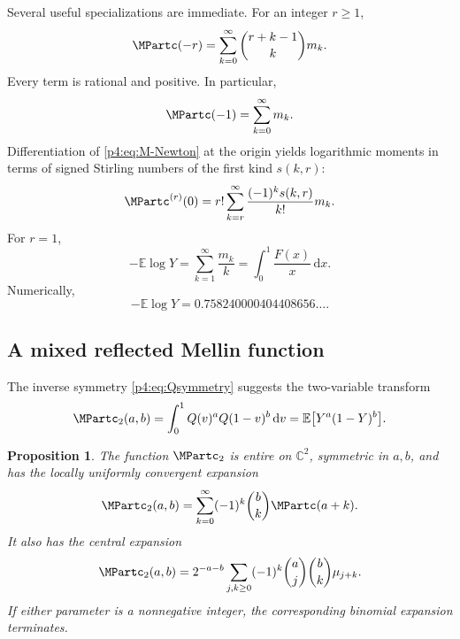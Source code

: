 \documentclass[11pt,oneside]{article}
\newtheorem{proposition}[theorem]{Proposition}
\theoremstyle{definition}
\theoremstyle{remark}
\newcommand{\F}{F}
\newcommand{\Q}{Q}
\newcommand{\E}{\mathbb E}
\newcommand{\C}{\mathbb C}
\newcommand{\dd}{\,\mathrm d}
\newcommand{\1}{\mathbf 1}
\begin{document}
Several useful specializations are immediate.  For an integer \(r\ge1\),
\begin{equation}\label{p4:eq:negative-moment-rational-series}
 \MPartc(-r)=\sum_{k=0}^{\infty}\binom{r+k-1}{k}m_k.
\end{equation}
Every term is rational and positive.  In particular,
\begin{equation}\label{p4:eq:Mminus1-series}
 \MPartc(-1)=\sum_{k=0}^{\infty}m_k.
\end{equation}
Differentiation of \cref{p4:eq:M-Newton} at the origin yields logarithmic moments in
terms of signed Stirling numbers of the first kind \(s(k,r)\):
\begin{equation}\label{p4:eq:log-moment-Stirling}
 \MPartc^{(r)}(0)
 =r!\sum_{k=r}^{\infty}\frac{(-1)^ks(k,r)}{k!}m_k.
\end{equation}
For \(r=1\),
\begin{equation}\label{p4:eq:log-moment-constant}
 -\E\log Y
 =\sum_{k=1}^{\infty}\frac{m_k}{k}
 =\int_0^1\frac{\F(x)}x\dd x.
\end{equation}
Numerically,
\begin{equation}\label{p4:eq:log-moment-numeric}
 -\E\log Y=0.758240000404408656\ldots.
\end{equation}

\subsection{A mixed reflected Mellin function}

The inverse symmetry \cref{p4:eq:Qsymmetry} suggests the two-variable transform
\begin{equation}\label{p4:eq:M2def}
 \MPartc_2(a,b)=\int_0^1\Q(v)^a\Q(1-v)^b\dd v
 =\E\bigl[Y^a(1-Y)^b\bigr].
\end{equation}

\begin{proposition}\label{p4:prop:M2}
The function \(\MPartc_2\) is entire on \(\C^2\), symmetric in \(a,b\), and has the
locally uniformly convergent expansion
\begin{equation}\label{p4:eq:M2-series}
 \MPartc_2(a,b)=\sum_{k=0}^{\infty}(-1)^k\binom bk\MPartc(a+k).
\end{equation}
It also has the central expansion
\begin{equation}\label{p4:eq:M2-central}
 \MPartc_2(a,b)=2^{-a-b}
 \sum_{j,k\ge0}(-1)^k\binom aj\binom bk\mu_{j+k}.
\end{equation}
If either parameter is a nonnegative integer, the corresponding binomial expansion
terminates.
\end{proposition}
\end{document}
